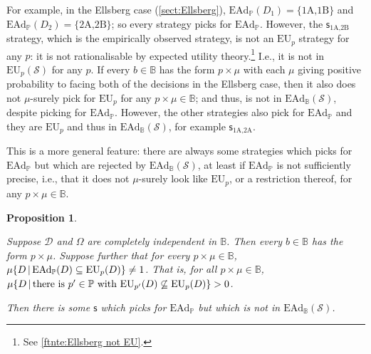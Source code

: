 \documentclass[a4paper]{article}
\newtheorem{proposition}[theorem]{Proposition}
\newcommand\D{\mathcal{D}}
\renewcommand\S{\mathcal{S}}
\newcommand\s{\mathsf{s}}
\renewcommand\P{\mathbb{P}} %
\newcommand\EU{\mathrm{EU}}
\newcommand\EAd{\mathrm{EAd}}
\newcommand{\IB}{\mathbb{B}}
\newcommand{\IP}{\P}
\newcommand{\pb}{b}
\renewcommand{\color}[1]{}
\newcommand{\Strategies}{\mathcal{S}}
\newcommand\SetDelimiter[1][]{
	\nonscript\,#1\vert \allowbreak \nonscript\,\mathopen{}}
\providecommand\given{\SetDelimiter}
\newenvironment{CCM rewritten}
{\begingroup\color{blue}} %
{\endgroup}              %
\begin{document}
{\color{violet}	For example, in the Ellsberg case (\cref{sect:Ellsberg}), $\EAd_\IP(D_1)=\{\text{1A,1B}\}$ and $\EAd_\IP(D_2)=\{\text{2A,2B}\}$; so every strategy picks for $\EAd_\IP$. However, the $\s_{\text{1A,2B}}$ strategy, which is the empirically observed strategy, is not an $\EU_p$ strategy for any $p$: it is not rationalisable by expected utility theory.\footnote{See \cref{ftnte:Ellsberg not EU}.} I.e., it is not in $\EU_p(\Strategies)$ for any $p$. If every $b\in\IB$ has the form $p\times\mu$ with each $\mu$ giving positive probability to facing both of the decisions in the Ellsberg case, then it also does not $\mu$-surely pick for $\EU_p$ for any $p\times\mu\in\IB$; and thus, is not in $\EAd_\IB(\S)$, despite picking for $\EAd_\IP$. However, the other strategies also pick for $\EAd_\IP$ and they are $\EU_p$ and thus in $\EAd_\IB(\S)$, for example $\s_{\text{1A,2A}}$. 



This is a more general feature: there are always some strategies which picks for $\EAd_\IP$ but which are rejected by $\EAd_\IB(\Strategies)$, at least if $\EAd_\IP$ is not sufficiently precise, i.e., that it does not $\mu$-surely look like $\EU_p$, or a restriction thereof, for any $p\times\mu\in\IB$. 
\begin{proposition}\label{thm:ead-existsimpermissibel[indep]}

{Suppose $\D$ and $\Omega$ are completely independent in $\IB$. Then every $\pb\in\IB$ has the form $p\times\mu$. Suppose further that for every $p\times \mu\in \IB$, $\mu\{D\given \EAd_\IP(D)\subseteq \EU_p(D)\}\neq 1$. That is, for all $p\times \mu\in \IB$, $\mu\{D\given \text{there is $p'\in\IP$ with }\EU_{p'}(D)\not\subseteq\EU_p(D)\}>0$. }

	
	
	Then there is some $\s$ which picks for $\EAd_\IP$ but which is not in $\EAd_\IB(\Strategies)$.
\end{proposition}


}
\end{document}
